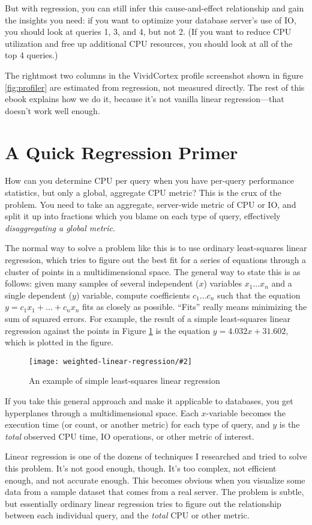 \documentclass{vivid_layout}
\newcommand{\myfig}[3]{
	\begin{figure}[!htpb]
	\begin{center}
	\rule{0mm}{5mm}
	\texttt{[image: weighted-linear-regression/\#2]}
	\caption{#3}\label{fig:#2}
	\end{center}
	\end{figure}
}
\begin{document}
But with regression, you can still infer this cause-and-effect relationship and gain the insights you need: if you want to optimize your database server's use of IO, you should look at queries 1, 3, and 4, but not 2. (If you want to reduce CPU utilization and free up additional CPU resources, you should look at all of the top 4 queries.)

The rightmost two columns in the VividCortex profile screenshot shown in figure \ref{fig:profiler} are estimated from regression, not measured directly. The rest of this ebook explains how we do it, because it's not vanilla linear regression---that doesn't work well enough.

\section{A Quick Regression Primer}

How can you determine CPU per query when you have per-query performance statistics, but only a global, aggregate CPU metric? This is the crux of the problem. You need to take an aggregate, server-wide metric of CPU or IO, and split it up into fractions which you blame on each type of query, effectively \emph{disaggregating a global metric}.

The normal way to solve a problem like this is to use ordinary least-squares linear regression, which tries to figure out the best fit for a series of equations through a cluster of points in a multidimensional space. The general way to state this is as follows: given many samples of several independent ($x$) variables $x_1...x_n$ and a single dependent ($y$) variable, compute coefficients $c_1...c_n$ such that the equation $y = c_1x_1 + ... + c_nx_n$ fits as closely as possible. ``Fits'' really means minimizing the sum of squared errors. For example, the result of a simple least-squares linear regression against the points in Figure \ref{fig:linear-regression} is the equation $y = 4.032x + 31.602$, which is plotted in the figure.

\myfig{0.5\textwidth}{linear-regression}{An example of simple least-squares linear regression}

If you take this general approach and make it applicable to databases, you get hyperplanes through a multidimensional space. Each $x$-variable becomes the execution time (or count, or another metric) for each type of query, and $y$ is the \emph{total} observed CPU time, IO operations, or other metric of interest.

Linear regression is one of the dozens of techniques I researched and tried to solve this problem. It's not good enough, though. It's too complex, not efficient enough, and not accurate enough. This becomes obvious when you visualize some data from a sample dataset that comes from a real server. The problem is subtle, but essentially ordinary linear regression tries to figure out the relationship between each individual query, and the \emph{total} CPU or other metric.
\end{document}
